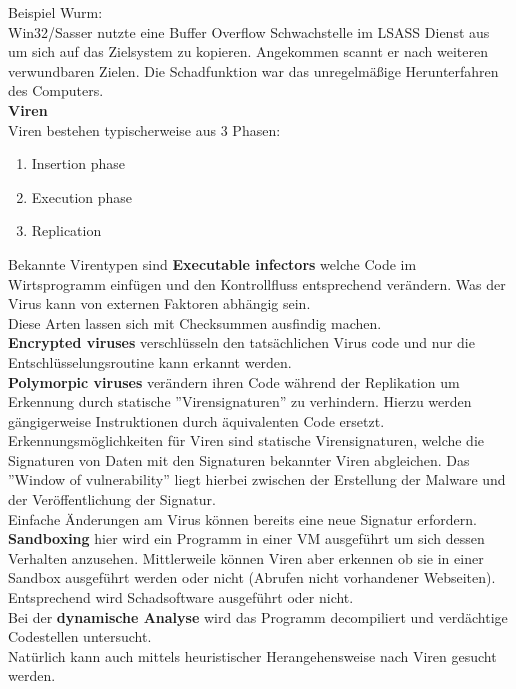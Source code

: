 \documentclass[a4paper,12pt,leqno]{article}
\begin{document}
Beispiel Wurm:\\
Win32/Sasser nutzte eine Buffer Overflow Schwachstelle im LSASS Dienst aus um sich auf das Zielsystem zu kopieren. Angekommen scannt er nach weiteren verwundbaren Zielen. Die Schadfunktion war das unregelmäßige Herunterfahren des Computers.\\

\textbf{Viren}\\
Viren bestehen typischerweise aus 3 Phasen:
\begin{enumerate}
\item Insertion phase
\item Execution phase
\item Replication
\end{enumerate}

Bekannte Virentypen sind \textbf{Executable infectors} welche Code im Wirtsprogramm einfügen und den Kontrollfluss entsprechend verändern. Was der Virus kann von externen Faktoren abhängig sein.\\
Diese Arten lassen sich mit Checksummen ausfindig machen.\\

\textbf{Encrypted viruses} verschlüsseln den tatsächlichen Virus code und nur die Entschlüsselungsroutine kann erkannt werden.\\

\textbf{Polymorpic viruses} verändern ihren Code während der Replikation um Erkennung durch statische ''Virensignaturen'' zu verhindern. Hierzu werden gängigerweise Instruktionen durch äquivalenten Code ersetzt.\\

Erkennungsmöglichkeiten für Viren sind statische Virensignaturen, welche die Signaturen von Daten mit den Signaturen bekannter Viren abgleichen. Das ''Window of vulnerability'' liegt hierbei zwischen der Erstellung der Malware und der Veröffentlichung der Signatur.\\
Einfache Änderungen am Virus können bereits eine neue Signatur erfordern.\\

\textbf{Sandboxing} hier wird ein Programm in einer VM ausgeführt um sich dessen Verhalten anzusehen. Mittlerweile können Viren aber erkennen ob sie in einer Sandbox ausgeführt werden oder nicht (Abrufen nicht vorhandener Webseiten). Entsprechend wird Schadsoftware ausgeführt oder nicht.\\
Bei der \textbf{dynamische Analyse} wird das Programm decompiliert und verdächtige Codestellen untersucht.\\
Natürlich kann auch mittels heuristischer Herangehensweise nach Viren gesucht werden.
\end{document}

